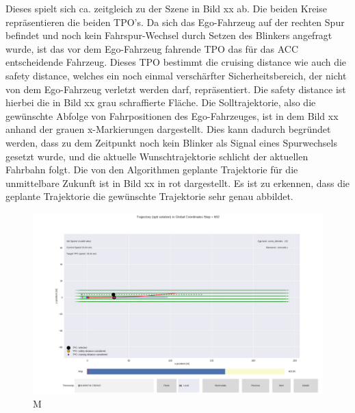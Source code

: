 Dieses spielt sich ca. zeitgleich zu der Szene in Bild xx ab. Die beiden Kreise repräsentieren die beiden TPO's. Da sich das Ego-Fahrzeug auf der rechten Spur befindet und noch kein Fahrspur-Wechsel durch Setzen des Blinkers angefragt wurde, ist das vor dem Ego-Fahrzeug fahrende TPO das für das ACC entscheidende Fahrzeug. Dieses TPO bestimmt die \glqq cruising distance\grqq{} wie auch die \glqq safety distance\grqq{}, welches ein noch einmal verschärfter Sicherheitsbereich, der nicht von dem Ego-Fahrzeug verletzt werden darf, repräsentiert. Die \grqq safety distance\grqq{} ist hierbei die in Bild xx grau schraffierte Fläche. Die \glqq Solltrajektorie\grqq{}, also die gewünschte Abfolge von Fahrpositionen des Ego-Fahrzeuges, ist in dem Bild xx anhand der grauen \glqq x\grqq{}-Markierungen dargestellt. Dies kann dadurch begründet werden, dass zu dem Zeitpunkt noch kein Blinker als Signal eines Spurwechsels gesetzt wurde, und die aktuelle Wunschtrajektorie schlicht der aktuellen Fahrbahn folgt. Die von den Algorithmen geplante Trajektorie für die unmittelbare Zukunft ist in Bild xx in rot dargestellt. Es ist zu erkennen, dass die geplante Trajektorie die gewünschte Trajektorie sehr genau abbildet.

\begin{figure}[!ht]
	\begin{center}
		\includegraphics[width=1.0\linewidth]{Abbildungen/bericht/process_logged_data_lc_part2}
		\caption{M}
		\label{fig.process_logged_data_part2}
	\end{center}
\end{figure}  

